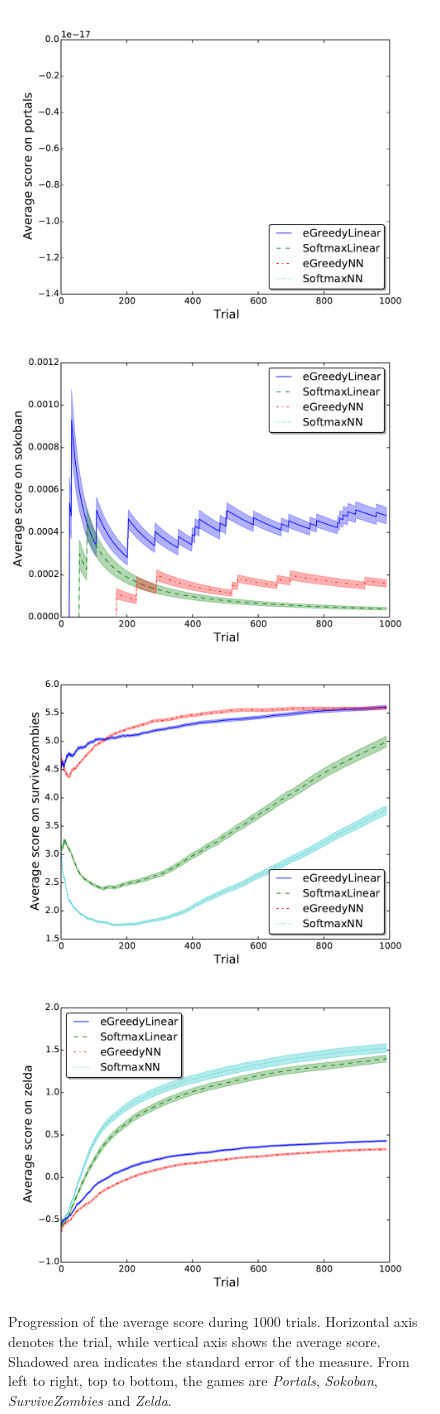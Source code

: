 \documentclass[conference]{IEEEtran}
\begin{document}
\begin{figure}[!t]
	\begin{center}

	\includegraphics[width = .45\textwidth]{img/portals_scores}
	\includegraphics[width = .45\textwidth]{img/sokoban_scores}\\

	\includegraphics[width = .45\textwidth]{img/survivezombies_scores}
	\includegraphics[width = .45\textwidth]{img/zelda_scores}\\

	\caption{Progression of the average score during $1000$ trials. Horizontal axis denotes the trial, while vertical axis shows the average score. Shadowed area indicates the standard error of the measure. From left to right, top to bottom, the games are \textit{Portals}, \textit{Sokoban}, \textit{SurviveZombies} and \textit{Zelda}.}
	\label{fig:results2}
	\end{center}
\end{figure}
\end{document}
